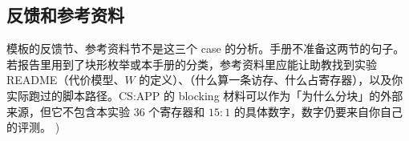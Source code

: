 \subsection{反馈和参考资料}

模板的反馈节、参考资料节不是这三个 case 的分析。手册不准备这两节的句子。若报告里用到了块形枚举或本手册的分类，参考资料里应能让助教找到实验 README（代价模型、$W$ 的定义）、（什么算一条访存、什么占寄存器），以及你实际跑过的脚本路径。CS:APP 的 blocking 材料可以作为「为什么分块」的外部来源，但它不包含本实验 $36$ 个寄存器和 $15:1$ 的具体数字，数字仍要来自你自己的评测。
)

